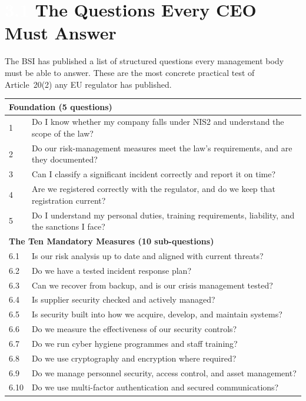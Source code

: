 \documentclass[11pt,a4paper,twoside]{book}
\newcommand{\lessontag}[1]{%
  \texorpdfstring{%
    \setlength{\fboxsep}{3pt}\colorbox{nisd2blue}{\textcolor{white}{\footnotesize\bfseries #1}}\quad%
  }{Lesson #1\ }%
}
\begin{document}
\section{\lessontag{3.1}The Questions Every CEO Must Answer}

The BSI has published a list of structured questions every management body must be able to answer. These are the most concrete practical test of Article~20(2) any EU regulator has published.

\begin{center}
\begin{tabular}{@{}p{0.3cm}p{10.5cm}@{}}
\toprule
\multicolumn{2}{l}{\textbf{Foundation (5 questions)}} \\
\midrule
1 & Do I know whether my company falls under NIS2 and understand the scope of the law? \\
2 & Do our risk-management measures meet the law's requirements, and are they documented? \\
3 & Can I classify a significant incident correctly and report it on time? \\
4 & Are we registered correctly with the regulator, and do we keep that registration current? \\
5 & Do I understand my personal duties, training requirements, liability, and the sanctions I face? \\
\midrule
\multicolumn{2}{l}{\textbf{The Ten Mandatory Measures (10 sub-questions)}} \\
\midrule
6.1 & Is our risk analysis up to date and aligned with current threats? \\
6.2 & Do we have a tested incident response plan? \\
6.3 & Can we recover from backup, and is our crisis management tested? \\
6.4 & Is supplier security checked and actively managed? \\
6.5 & Is security built into how we acquire, develop, and maintain systems? \\
6.6 & Do we measure the effectiveness of our security controls? \\
6.7 & Do we run cyber hygiene programmes and staff training? \\
6.8 & Do we use cryptography and encryption where required? \\
6.9 & Do we manage personnel security, access control, and asset management? \\
6.10 & Do we use multi-factor authentication and secured communications? \\

\end{tabular}
\end{center}
\end{document}
